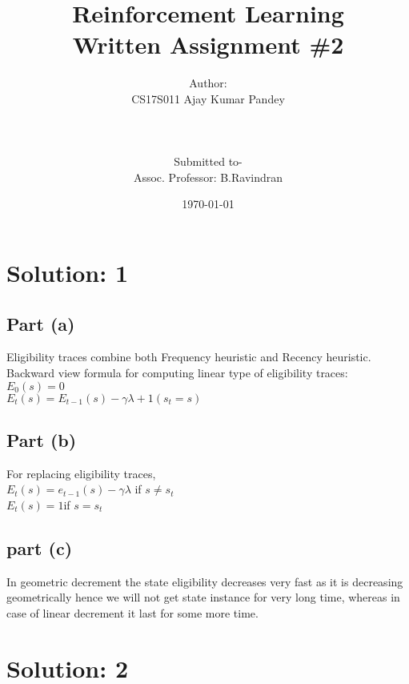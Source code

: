 \documentclass{article}
\begin{document}
\title{Reinforcement Learning \\Written Assignment \#2}
\author{Author:\\CS17S011 Ajay Kumar Pandey
\\ \\ \\ \\ Submitted to- \\Assoc. Professor: B.Ravindran }

\date{\today}
\maketitle
\newpage

\section{Solution: 1} 
\subsection{Part (a)}
Eligibility traces combine both Frequency heuristic and Recency heuristic.
\\Backward view formula for computing linear type of eligibility traces:
\\$E_0(s)=0$
\\$E_t(s) = E_{t-1}(s) - \gamma\lambda +1(s_t=s)$

\subsection{Part (b)}
For replacing eligibility traces,
\\$E_t(s) = e_{t-1}(s) - \gamma\lambda$ \space\space\space if $s\neq s_t$
\\$E_t(s) = 1 $\space\space\space if $s = s_t$ 
\subsection{part (c)}
In geometric decrement the state eligibility decreases very fast as it is decreasing geometrically hence we will not get state instance for very long time, whereas in case of linear decrement it last for some more time. 

\section{Solution: 2} 
\end{document}
